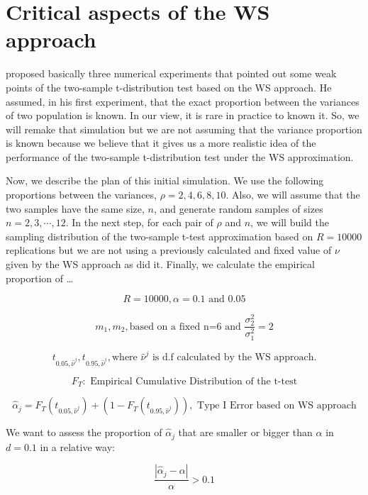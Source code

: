 \documentclass[
  authoryear,
  preprint,
  3p]{elsarticle}
\begin{document}
\section{Critical aspects of the WS
approach}\label{critical-aspects-of-the-ws-approach}

\citet{lloyd_2-sample_2013} proposed basically three numerical
experiments that pointed out some weak points of the two-sample
t-distribution test based on the WS approach. He assumed, in his first
experiment, that the exact proportion between the variances of two
population is known. In our view, it is rare in practice to known it.
So, we will remake that simulation but we are not assuming that the
variance proportion is known because we believe that it gives us a more
realistic idea of the performance of the two-sample t-distribution test
under the WS approximation.

Now, we describe the plan of this initial simulation. We use the
following proportions between the variances, \(\rho = 2,4,6,8,10\).
Also, we will assume that the two samples have the same size, \(n\), and
generate random samples of sizes \(n = 2,3,\cdots,12\). In the next
step, for each pair of \(\rho\) and \(n\), we will build the sampling
distribution of the two-sample t-test approximation based on \(R=10000\)
replications but we are not using a previously calculated and fixed
value of \(\nu\) given by the WS approach as \citet{lloyd_2-sample_2013}
did it. Finally, we calculate the empirical proportion of \ldots{}

\[R = 10000, \alpha = 0.1 \text{ and } 0.05\]

\[m_1,m_2 , \text{based on a fixed n=6 and } \frac{\sigma_2^2}{\sigma_1^2} = 2\]

\[t_{0.05,\hat{\nu}^j}, t_{0.95,\hat{\nu}^j},\text{where } \hat{\nu}^j \text{ is d.f calculated by the WS approach.}\]

\[F_{T}: \text{\ Empirical Cumulative Distribution of the t-test}\]

\[\hat{\alpha}_j = F_{T}(t_{0.05,\hat{\nu}^j}) + ( 1 - F_{T}( t_{0.95,\hat{\nu}^j})), \text{\ Type I Error based on WS approach}\]

We want to assess the proportion of \(\hat{\alpha}_j\) that are smaller
or bigger than \(\alpha\) in \(d=0.1\) in a relative way:

\[\frac{|\hat{\alpha}_j - \alpha|}{\alpha} > 0.1\]


\renewcommand\refname{References}
  
\end{document}
